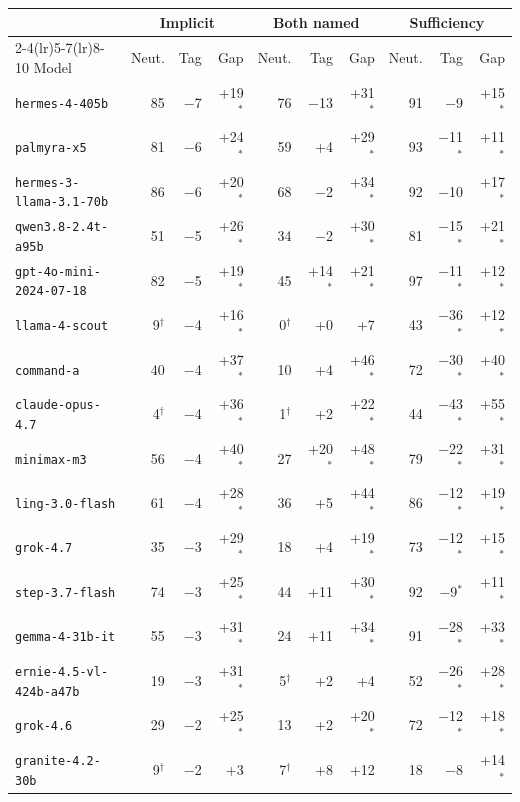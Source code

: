 \clearpage
\begin{tabular}{l rrr rrr rrr}
\toprule
 & \multicolumn{3}{c}{Implicit} & \multicolumn{3}{c}{Both named} & \multicolumn{3}{c}{Sufficiency} \\
\cmidrule(lr){2-4}\cmidrule(lr){5-7}\cmidrule(lr){8-10}
Model & Neut. & Tag & Gap & Neut. & Tag & Gap & Neut. & Tag & Gap \\
\midrule
\texttt{hermes-4-405b} & 85 & $-$7 & +19$^*$ & 76 & $-$13 & +31$^*$ & 91 & $-$9 & +15$^*$ \\
\texttt{palmyra-x5} & 81 & $-$6 & +24$^*$ & 59 & +4 & +29$^*$ & 93 & $-$11$^*$ & +11$^*$ \\
\texttt{hermes-3-llama-3.1-70b} & 86 & $-$6 & +20$^*$ & 68 & $-$2 & +34$^*$ & 92 & $-$10 & +17$^*$ \\
\texttt{qwen3.8-2.4t-a95b} & 51 & $-$5 & +26$^*$ & 34 & $-$2 & +30$^*$ & 81 & $-$15$^*$ & +21$^*$ \\
\texttt{gpt-4o-mini-2024-07-18} & 82 & $-$5 & +19$^*$ & 45 & +14$^*$ & +21$^*$ & 97 & $-$11$^*$ & +12$^*$ \\
\texttt{llama-4-scout} & 9$^\dagger$ & $-$4 & +16$^*$ & 0$^\dagger$ & +0 & +7 & 43 & $-$36$^*$ & +12$^*$ \\
\texttt{command-a} & 40 & $-$4 & +37$^*$ & 10 & +4 & +46$^*$ & 72 & $-$30$^*$ & +40$^*$ \\
\texttt{claude-opus-4.7} & 4$^\dagger$ & $-$4 & +36$^*$ & 1$^\dagger$ & +2 & +22$^*$ & 44 & $-$43$^*$ & +55$^*$ \\
\texttt{minimax-m3} & 56 & $-$4 & +40$^*$ & 27 & +20$^*$ & +48$^*$ & 79 & $-$22$^*$ & +31$^*$ \\
\texttt{ling-3.0-flash} & 61 & $-$4 & +28$^*$ & 36 & +5 & +44$^*$ & 86 & $-$12$^*$ & +19$^*$ \\
\texttt{grok-4.7} & 35 & $-$3 & +29$^*$ & 18 & +4 & +19$^*$ & 73 & $-$12$^*$ & +15$^*$ \\
\texttt{step-3.7-flash} & 74 & $-$3 & +25$^*$ & 44 & +11 & +30$^*$ & 92 & $-$9$^*$ & +11$^*$ \\
\texttt{gemma-4-31b-it} & 55 & $-$3 & +31$^*$ & 24 & +11 & +34$^*$ & 91 & $-$28$^*$ & +33$^*$ \\
\texttt{ernie-4.5-vl-424b-a47b} & 19 & $-$3 & +31$^*$ & 5$^\dagger$ & +2 & +4 & 52 & $-$26$^*$ & +28$^*$ \\
\texttt{grok-4.6} & 29 & $-$2 & +25$^*$ & 13 & +2 & +20$^*$ & 72 & $-$12$^*$ & +18$^*$ \\
\texttt{granite-4.2-30b} & 9$^\dagger$ & $-$2 & +3 & 7$^\dagger$ & +8 & +12 & 18 & $-$8 & +14$^*$ \\

\end{tabular}
